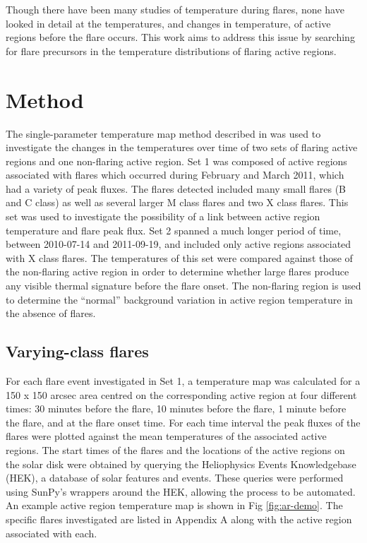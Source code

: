 \documentclass[namedreferences]{solarphysics}
\begin{document}
\begin{article}
Though there have been many studies of temperature during flares, none have looked in detail at the temperatures, and changes in temperature, of active regions before the flare occurs.
This work aims to address this issue by searching for flare precursors in the temperature distributions of flaring active regions.

\section{Method}

The single-parameter temperature map method described in \cite{Leonard} was used to investigate the changes in the temperatures over time of two sets of flaring active regions and one non-flaring active region.
Set 1 was composed of active regions associated with flares which occurred during February and March 2011, which had a variety of peak fluxes.
The flares detected included many small flares (B and C class) as well as several larger M class flares and two X class flares.
This set was used to investigate the possibility of a link between active region temperature and flare peak flux.
Set 2 spanned a much longer period of time, between 2010-07-14 and 2011-09-19, and included only active regions associated with X class flares.
The temperatures of this set were compared against those of the non-flaring active region in order to determine whether large flares produce any visible thermal signature before the flare onset.
The non-flaring region is used to determine the ``normal'' background variation in active region temperature in the absence of flares.

\subsection{Varying-class flares}
For each flare event investigated in Set 1, a temperature map was calculated for a 150 x 150 arcsec area centred on the corresponding active region at four different times: 30 minutes before the flare, 10 minutes before the flare, 1 minute before the flare, and at the flare onset time.
For each time interval the peak fluxes of the flares were plotted against the mean temperatures of the associated active regions.
The start times of the flares and the locations of the active regions on the solar disk were obtained by querying the Heliophysics Events Knowledgebase (HEK), a database of solar features and events.
These queries were performed using SunPy's wrappers around the HEK, allowing the process to be automated.
An example active region temperature map is shown in Fig \ref{fig:ar-demo}.
The specific flares investigated are listed in Appendix A along with the active region associated with each. %


\end{article}
\end{document}
